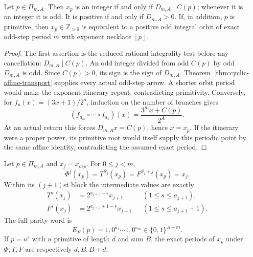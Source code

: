 \begin{corollary}
\label{cor:typed-positive-cycle-criterion}
Let $p\in\Pi_{m,A}$.  Then $x_p$ is an integer if and only if
$D_{m,A}\mid C(p)$; whenever it is an integer it is odd.  It is positive if
and only if $D_{m,A}>0$.  If, in addition, $p$ is primitive, then
$x_p\in\mathbb Z_{>0}$ is equivalent to a positive odd integral orbit of
exact odd-step period $m$ with exponent necklace $[p]$.
\end{corollary}

\begin{proof}
The first assertion is the reduced rational integrality test before any
cancellation: $D_{m,A}\mid C(p)$.  An odd integer divided from odd $C(p)$ by
odd $D_{m,A}$ is odd.  Since $C(p)>0$, its sign is the sign of $D_{m,A}$.
Theorem~\ref{thm:cyclic-affine-transport} supplies every actual odd-step
arrow.  A shorter orbit period would make the exponent itinerary repeat,
contradicting primitivity.  Conversely, for $f_a(x)=(3x+1)/2^a$, induction
on the number of branches gives
\[
 (f_{a_m}\circ\cdots\circ f_{a_1})(x)
       =\frac{3^m x+C(p)}{2^A}.
\]
At an actual return this forces $D_{m,A}x=C(p)$, hence $x=x_p$.
If the itinerary were a proper power, its primitive root would itself
supply this periodic point by the same affine identity, contradicting the
assumed exact period.
\end{proof}

\begin{theorem}
\label{thm:packet-three-clocks}
Let $p\in\Pi_{m,A}$ and $x_j=x_{\sigma^jp}$.  For $0\le j<m$,
\[
 \Phi^j(x_p)=T^{S_j}(x_p)=F^{S_j+j}(x_p)=x_j.
\]
Within its $(j+1)$st block the intermediate values are exactly
\begin{align*}
 T^s(x_j)&=2^{a_{j+1}-s}x_{j+1}
       &&(1\le s\le a_{j+1}),\\
 F^s(x_j)&=2^{a_{j+1}+1-s}x_{j+1}
       &&(1\le s\le a_{j+1}+1).
\end{align*}
The full parity word is
\[
 E_F(p)=1,0^{a_1}\cdots1,0^{a_m}\in\{0,1\}^{A+m}.
\]
If $p=u^r$ with $u$ primitive of length $d$ and sum $B$, the exact
periods of $x_p$ under $\Phi,T,F$ are respectively $d,B,B+d$.
\end{theorem}

